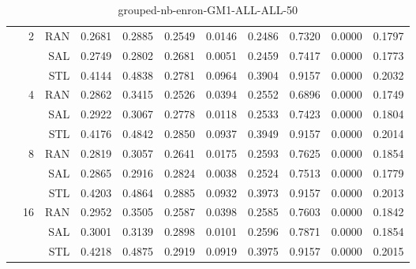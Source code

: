 \begin{center}
\begin{table}[htbp]
\begin{tabular}{ | r | r | r | r | r | r | r | r | r | r | r |}
 & \multirow{3}{*}{2} & RAN & 0.2681 & 0.2885 & 0.2549 & 0.0146 & 0.2486 & 0.7320 & 0.0000 & 0.1797\\ \cline{3-11}
 &   & SAL & 0.2749 & 0.2802 & 0.2681 & 0.0051 & 0.2459 & 0.7417 & 0.0000 & 0.1773\\ \cline{3-11}
 &   & STL & 0.4144 & 0.4838 & 0.2781 & 0.0964 & 0.3904 & 0.9157 & 0.0000 & 0.2032\\ \cline{2-11}
 & \multirow{3}{*}{4} & RAN & 0.2862 & 0.3415 & 0.2526 & 0.0394 & 0.2552 & 0.6896 & 0.0000 & 0.1749\\ \cline{3-11}
 &   & SAL & 0.2922 & 0.3067 & 0.2778 & 0.0118 & 0.2533 & 0.7423 & 0.0000 & 0.1804\\ \cline{3-11}
 &   & STL & 0.4176 & 0.4842 & 0.2850 & 0.0937 & 0.3949 & 0.9157 & 0.0000 & 0.2014\\ \cline{2-11}
 & \multirow{3}{*}{8} & RAN & 0.2819 & 0.3057 & 0.2641 & 0.0175 & 0.2593 & 0.7625 & 0.0000 & 0.1854\\ \cline{3-11}
 &   & SAL & 0.2865 & 0.2916 & 0.2824 & 0.0038 & 0.2524 & 0.7513 & 0.0000 & 0.1779\\ \cline{3-11}
 &   & STL & 0.4203 & 0.4864 & 0.2885 & 0.0932 & 0.3973 & 0.9157 & 0.0000 & 0.2013\\ \cline{2-11}
 & \multirow{3}{*}{16} & RAN & 0.2952 & 0.3505 & 0.2587 & 0.0398 & 0.2585 & 0.7603 & 0.0000 & 0.1842\\ \cline{3-11}
 &   & SAL & 0.3001 & 0.3139 & 0.2898 & 0.0101 & 0.2596 & 0.7871 & 0.0000 & 0.1854\\ \cline{3-11}
 &   & STL & 0.4218 & 0.4875 & 0.2919 & 0.0919 & 0.3975 & 0.9157 & 0.0000 & 0.2015\\ \cline{2-11}
\hline
\end{tabular}
\caption{grouped-nb-enron-GM1-ALL-ALL-50}
\end{table}
\end{center}

